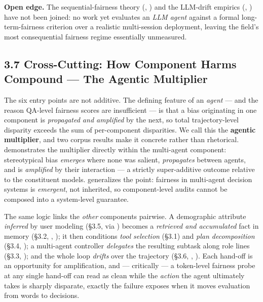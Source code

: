 \documentclass[sigconf,nonacm]{acmart}
\begin{document}
\textbf{Open edge.} The sequential-fairness theory (\cite{hu2022achieving}, \cite{xu2024adapting}) and the LLM-drift empirics (\cite{fan2024fairmt}, \cite{ma2026implicit}) have not been joined: no work yet evaluates an \emph{LLM agent} against a formal long-term-fairness criterion over a realistic multi-session deployment, leaving the field's most consequential fairness regime essentially unmeasured.

\subsection{3.7 Cross-Cutting: How Component Harms Compound — The Agentic Multiplier}

The six entry points are not additive. The defining feature of an \emph{agent} — and the reason QA-level fairness scores are insufficient — is that a bias originating in one component is \emph{propagated and amplified} by the next, so total trajectory-level disparity exceeds the sum of per-component disparities. We call this the \textbf{agentic multiplier}, and two corpus results make it concrete rather than rhetorical. \cite{nguyen2025social} demonstrates the multiplier directly within the multi-agent component: stereotypical bias \emph{emerges} where none was salient, \emph{propagates} between agents, and is \emph{amplified} by their interaction — a strictly super-additive outcome relative to the constituent models. \cite{madigan2025emergent} generalizes the point: fairness in multi-agent decision systems is \emph{emergent}, not inherited, so component-level audits cannot be composed into a system-level guarantee.

The same logic links the \emph{other} components pairwise. A demographic attribute \emph{inferred} by user modeling (§3.5, via \cite{staab2023memorization}) becomes a \emph{retrieved and accumulated} fact in memory (§3.2, \cite{fan2024fairmt}, \cite{ma2026implicit}); it then conditions \emph{tool selection} (§3.1) and \emph{plan decomposition} (§3.4, \cite{li2025actions}); a multi-agent controller \emph{delegates} the resulting subtask along role lines (§3.3, \cite{nguyen2025social}); and the whole loop \emph{drifts} over the trajectory (§3.6, \cite{wyllie2024fairness}, \cite{xu2024adapting}). Each hand-off is an opportunity for amplification, and — critically — a token-level fairness probe at any single hand-off can read as clean while the \emph{action} the agent ultimately takes is sharply disparate, exactly the failure \cite{li2025actions} exposes when it moves evaluation from words to decisions.
\end{document}
